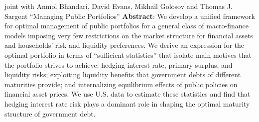 

\begin{cventries}

\cventry
    {joint with Anmol Bhandari, David Evans, Mikhail Golosov and Thomas J. Sargent} %
    {“Managing Public Portfolios” } %
    {} %
    {} %
    {\textbf{Abstract}: We develop a unified framework for optimal management of public portfolios for a general class of macro-finance models imposing very few restrictions on the market structure for financial assets and households' risk and liquidity preferences. We derive an expression for the optimal portfolio in terms of ``sufficient statistics'' that isolate main motives that the portfolio strives to achieve: hedging interest rate, primary surplus, and liquidity risks; exploiting liquidity benefits that government debts of different maturities provide; and internalizing equilibrium effects of public policies on financial asset prices. We use U.S. data to estimate these statistics and find that hedging interest rate risk plays a dominant role in shaping the optimal maturity structure of government debt.}

\end{cventries}
